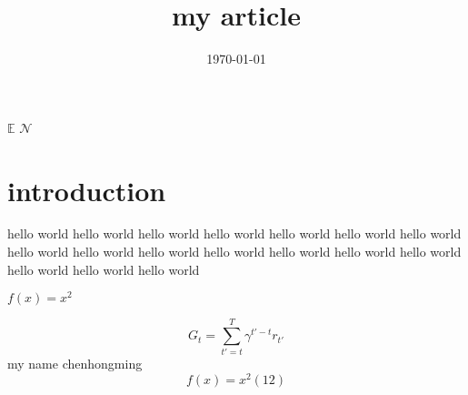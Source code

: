 \documentclass{article}
\title{my article}
\date{\today}
\begin{document}
\maketitle


$\mathbb{E}$
$\mathcal{N}$



\section{introduction}


hello world\cite{sutton1998}
hello world\cite{sutton2017}
hello world\cite{Rummery1}
hello world
hello world
hello world
hello world
hello world
hello world
hello world
hello world
hello world
hello world
hello world
hello world
hello world
hello world

$f(x)=x^2$

    \begin{equation}
    G_{t}=\sum_{{t}'=t}^{T}\gamma ^{{t}'-t}r_{{t}'}
    \end{equation}
my name chenhongming$$f(x)=x^2(12)$$%
\nocite{*}%

\end{document}
